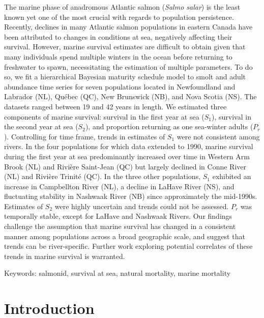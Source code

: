 \documentclass[12pt]{article}
\newcommand{\So}{$S_{1}$\xspace}
\newcommand{\St}{$S_{2}$\xspace}
\newcommand{\Pg}{$P_r$\xspace}
\begin{document}
The marine phase of anadromous Atlantic salmon (\emph{Salmo salar}) is the
least known yet one of the most crucial with regards to population
persistence. Recently, declines in many Atlantic salmon populations in eastern
Canada have been attributed to changes in conditions at sea, negatively
affecting their survival. However, marine survival estimates are difficult to
obtain given that many individuals spend multiple winters in the ocean before
returning to freshwater to spawn, necessitating the estimation of multiple
parameters. To do so, we fit a hierarchical Bayesian maturity schedule model
to smolt and adult abundance time series for seven populations located in
Newfoundland and Labrador (NL), Qu\'{e}bec (QC), New Brunswick (NB), and Nova
Scotia (NS). The datasets ranged between 19 and 42 years in length. We
estimated three components of marine survival: survival in the first year at
sea (\So), survival in the second year at sea (\St), and proportion returning
as one sea-winter adults (\Pg). Controlling for time frame, trends in
estimates of \So were not consistent among rivers.
In the four populations for which data extended to 1990, marine survival
during the first year at sea predominantly increased over time in Western Arm
Brook (NL) and Rivi\`{e}re Saint-Jean (QC) but largely declined in Conne River
(NL) and Rivi\`{e}re Trinit\'{e} (QC). In the three other populations, \So
exhibited an increase in Campbellton River (NL), a decline in LaHave River
(NS), and fluctuating stability in Nashwaak River (NB) since approximately the
mid-1990s. 
Estimates of \St were highly uncertain and trends could not be assessed. \Pg
was temporally stable, except for LaHave and Nashwaak Rivers. Our findings
challenge the assumption that marine survival has changed in a consistent
manner among populations across a broad geographic scale, and suggest that
trends can be river-specific. Further work exploring potential correlates of
these trends in marine survival is warranted.

Keywords: salmonid, survival at sea, natural mortality, marine mortality


\section*{Introduction} %

\end{document}
